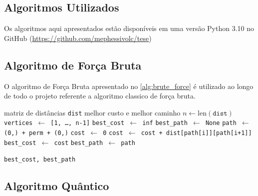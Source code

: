 
\begin{apendicesenv}

\partapendices

\chapter{Algoritmos Utilizados} \label{sec:algorithm_append}

Os algoritmos aqui apresentados estão disponíveis em uma versão Python 3.10 no GitHub (\url{https://github.com/mephessivolc/tese})

\section{Algoritmo de Força Bruta}

O algoritmo de Força Bruta apresentado no \autoref{alg:brute_force} é utilizado ao longo de todo o projeto referente a algoritmo classico de força bruta.


\begin{algorithm}
\caption{Algoritmo de Força Bruta}
    \label{alg:brute_force}
    \begin{algorithmic}[1]
    \Require matriz de distâncias \texttt{dist}
    \Ensure melhor custo e melhor caminho
    \State $n \gets \text{len}(\texttt{dist})$
    \State \texttt{vertices $\gets$ [1, \dots, n-1]}
    \State \texttt{best\_cost $\gets$ inf}
    \State \texttt{best\_path $\gets$ None}
        \State \texttt{path $\gets$ (0,) + perm + (0,)}
        \State \texttt{cost $\gets$ 0}
            \State \texttt{cost $\gets$ cost + dist[path[i]][path[i+1]]}
        \EndFor
            \State \texttt{best\_cost $\gets$ cost}
            \State \texttt{best\_path $\gets$ path}
        \EndIf
    \EndFor
    
    \State \Return \texttt{best\_cost, best\_path}
    \end{algorithmic}
\end{algorithm}


\section{Algoritmo Quântico}


\end{apendicesenv}
